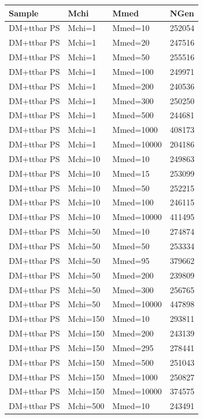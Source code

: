 \begin{table}[]
\centering
\begin{tabular}{llll}
\hline \hline
Sample & Mchi    & Mmed    & NGen \\ \hline
DM+ttbar  PS & Mchi=1    & Mmed=10    & 252054 \\
DM+ttbar  PS & Mchi=1    & Mmed=20    & 247516 \\
DM+ttbar  PS & Mchi=1    & Mmed=50    & 255516 \\
DM+ttbar  PS & Mchi=1    & Mmed=100   & 249971 \\
DM+ttbar  PS & Mchi=1    & Mmed=200   & 240536 \\
DM+ttbar  PS & Mchi=1    & Mmed=300   & 250250 \\
DM+ttbar  PS & Mchi=1    & Mmed=500   & 244681 \\
DM+ttbar  PS & Mchi=1    & Mmed=1000  & 408173 \\
DM+ttbar  PS & Mchi=1    & Mmed=10000 & 204186 \\
DM+ttbar  PS & Mchi=10   & Mmed=10    & 249863 \\
DM+ttbar  PS & Mchi=10   & Mmed=15    & 253099 \\
DM+ttbar  PS & Mchi=10   & Mmed=50    & 252215 \\
DM+ttbar  PS & Mchi=10   & Mmed=100   & 246115 \\
DM+ttbar  PS & Mchi=10   & Mmed=10000 & 411495 \\
DM+ttbar  PS & Mchi=50   & Mmed=10    & 274874 \\
DM+ttbar  PS & Mchi=50   & Mmed=50    & 253334 \\
DM+ttbar  PS & Mchi=50   & Mmed=95    & 379662 \\
DM+ttbar  PS & Mchi=50   & Mmed=200   & 239809 \\
DM+ttbar  PS & Mchi=50   & Mmed=300   & 256765 \\
DM+ttbar  PS & Mchi=50   & Mmed=10000 & 447898 \\
DM+ttbar  PS & Mchi=150  & Mmed=10    & 293811 \\
DM+ttbar  PS & Mchi=150  & Mmed=200   & 243139 \\
DM+ttbar  PS & Mchi=150  & Mmed=295   & 278441 \\
DM+ttbar  PS & Mchi=150  & Mmed=500   & 251043 \\
DM+ttbar  PS & Mchi=150  & Mmed=1000  & 250827 \\
DM+ttbar  PS & Mchi=150  & Mmed=10000 & 374575 \\
DM+ttbar  PS & Mchi=500  & Mmed=10    & 243491 \\

\end{tabular}
\end{table}
